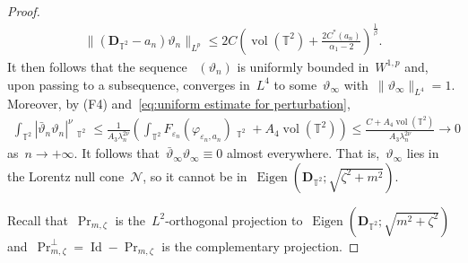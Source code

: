 \documentclass[11pt,final]{amsart}
\newcommand{\C}{\mathbb{C}}
\newcommand{\T}{\mathbb{T}}
\newcommand{\dd}{\mathop{}\!\mathrm{d}}
\newcommand{\eps}{\varepsilon}
\newcommand{\pD}{\mathbf{D}}
\newcommand{\parenthesis}[1]{\left(#1\right)} %
\newcommand{\braces}[1]{\left\{#1\right\}} %
\DeclareMathOperator{\dv}{\dd{vol}}
\DeclareMathOperator{\Eigen}{Eigen}
\DeclareMathOperator{\id}{Id}
\DeclareMathOperator{\proj}{Pr}
\DeclareMathOperator{\Span}{Span}
\DeclareMathOperator{\vol}{vol}
\begin{document}
\begin{proof}
\begin{align}
    \|(\pD_{\T^2}-a_n)\vartheta_n\|_{L^p} \leq 2C \parenthesis{ \vol(\mathbb{T}^2)+\frac{2 C^*(a_n)}{\alpha_1-2} }^{\frac{1}{\beta}}.
\end{align}
It then follows that the sequence ~$(\vartheta_n)$ is uniformly bounded in~$W^{1,p}$ and,  upon passing to a subsequence, converges in~$L^4$ to some~$\vartheta_\infty$ with~$\|\vartheta_\infty\|_{L^4}=1$.
Moreover, by (F4) and~\eqref{eq:uniform estimate for perturbation}, 
\begin{align}
    \int_{\mathbb{T}^2} |\bar{\vartheta}_{n}\vartheta_{n}|^\nu\dv_{\T^2} \leq \frac{1}{A_3\lambda_n^{2\nu}} \parenthesis{ \int_{\mathbb{T}^2} F_{\eps_n}(\varphi_{\eps_n,a_n})\dv_{\T^2} + A_4\vol(\mathbb{T}^2)}
    \leq \frac{C+A_4 \vol(\mathbb{T}^2)}{A_3\lambda_n^{2\nu}}\to 0
\end{align}
as~$n\to+\infty$.
It follows that~$\bar{\vartheta}_\infty\vartheta_\infty\equiv 0$ almost everywhere. 
That is,~$\vartheta_\infty$ lies in the Lorentz null cone~$\mathcal{N}$,
so it cannot be in~$\Eigen(\pD_{\T^2};\sqrt{\zeta^2+m^2})$.


Recall that~$\proj_{m,\zeta}$ is the~$L^2$-orthogonal projection to~$\Eigen(\pD_{\T^2};\sqrt{m^2+\zeta^2})$ and~$\proj_{m,\zeta}^\perp = \id -\proj_{m,\zeta}$ is the complementary projection.


\end{proof}
\end{document}
